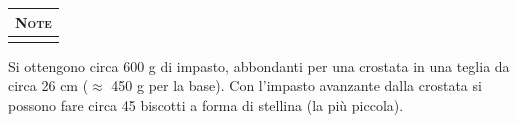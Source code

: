 \begin{minipage}[t][\textheight][t]{\textwidth}
    \vspace*{\fill}

    \begin{tabularx}{\linewidth}{X}
    {\Large \textsc{Note}} \\ \hline \hline \\
    \end{tabularx}
	Si ottengono circa 600 g di impasto, abbondanti per una crostata in una teglia da circa 26 cm ($\approx$ 450 g per la base). Con l'impasto avanzante dalla crostata si possono fare circa 45 biscotti a forma di stellina (la più piccola).
    
\end{minipage}